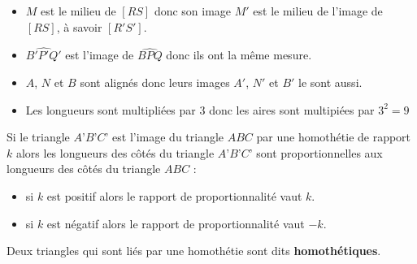 \begin{exemple*1}

    \begin{itemize}
        \item $M$ est le milieu de $[RS]$ donc son image $M'$ est le milieu de l'image de $[RS]$, à savoir $[R'S']$.
        \item $\widehat{B'P'Q'}$ est l'image de $\widehat{BPQ}$ donc ils ont la même mesure.
        \item $A$, $N$ et $B$ sont alignés donc leurs images $A'$, $N'$ et $B'$ le sont aussi.
        \item Les longueurs sont multipliées par $3$ donc les aires sont multipiées par $3^2=9$
    \end{itemize}
\end{exemple*1}
\begin{propriete}[\admise]
    Si le triangle $A’B’C’$ est l’image du triangle $ABC$ par une homothétie de rapport $k$ alors les longueurs des côtés du triangle $A’B’C’$ sont proportionnelles aux longueurs des côtés du triangle $ABC$ :
    \begin{itemize}
        \item si $k$ est positif alors le rapport de proportionnalité vaut $k$.
        \item si $k$ est négatif alors le rapport de proportionnalité vaut $-k$.
    \end{itemize}
\end{propriete}
\begin{remarque}
    Deux triangles qui sont liés par une homothétie sont dits \textbf{homothétiques}.
    \begin{center}
    \end{center}
\end{remarque}